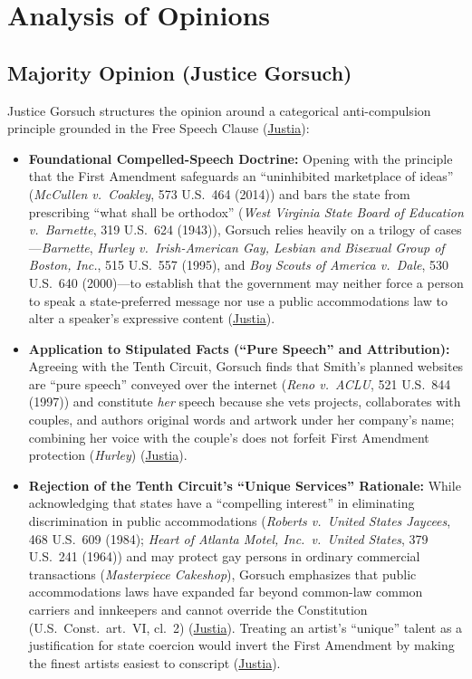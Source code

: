 \documentclass[12pt]{article}
\begin{document}
\section{Analysis of Opinions}

\subsection{Majority Opinion (Justice Gorsuch)}
Justice Gorsuch structures the opinion around a categorical anti-compulsion principle grounded in the Free Speech Clause (\href{https://supreme.justia.com/cases/federal/us/600/21-476/}{Justia}):
\begin{itemize}
  \item \textbf{Foundational Compelled-Speech Doctrine:} Opening with the principle that the First Amendment safeguards an ``uninhibited marketplace of ideas'' (\textit{McCullen v.\ Coakley}, 573 U.S.\ 464 (2014)) and bars the state from prescribing ``what shall be orthodox'' (\textit{West Virginia State Board of Education v.\ Barnette}, 319 U.S.\ 624 (1943)), Gorsuch relies heavily on a trilogy of cases---\textit{Barnette}, \textit{Hurley v.\ Irish-American Gay, Lesbian and Bisexual Group of Boston, Inc.}, 515 U.S.\ 557 (1995), and \textit{Boy Scouts of America v.\ Dale}, 530 U.S.\ 640 (2000)---to establish that the government may neither force a person to speak a state-preferred message nor use a public accommodations law to alter a speaker's expressive content (\href{https://supreme.justia.com/cases/federal/us/600/21-476/}{Justia}).
  \item \textbf{Application to Stipulated Facts (``Pure Speech'' and Attribution):} Agreeing with the Tenth Circuit, Gorsuch finds that Smith's planned websites are ``pure speech'' conveyed over the internet (\textit{Reno v.\ ACLU}, 521 U.S.\ 844 (1997)) and constitute \emph{her} speech because she vets projects, collaborates with couples, and authors original words and artwork under her company's name; combining her voice with the couple's does not forfeit First Amendment protection (\textit{Hurley}) (\href{https://supreme.justia.com/cases/federal/us/600/21-476/}{Justia}).
  \item \textbf{Rejection of the Tenth Circuit's ``Unique Services'' Rationale:} While acknowledging that states have a ``compelling interest'' in eliminating discrimination in public accommodations (\textit{Roberts v.\ United States Jaycees}, 468 U.S.\ 609 (1984); \textit{Heart of Atlanta Motel, Inc.\ v.\ United States}, 379 U.S.\ 241 (1964)) and may protect gay persons in ordinary commercial transactions (\textit{Masterpiece Cakeshop}), Gorsuch emphasizes that public accommodations laws have expanded far beyond common-law common carriers and innkeepers and cannot override the Constitution (U.S.\ Const.\ art.\ VI, cl.\ 2) (\href{https://supreme.justia.com/cases/federal/us/600/21-476/}{Justia}). Treating an artist's ``unique'' talent as a justification for state coercion would invert the First Amendment by making the finest artists easiest to conscript (\href{https://supreme.justia.com/cases/federal/us/600/21-476/}{Justia}).

\end{itemize}
\end{document}
